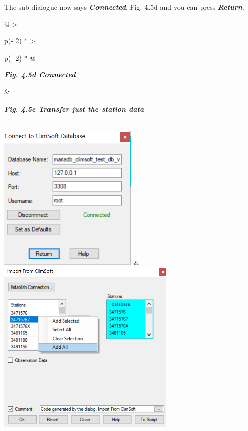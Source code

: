\documentclass[
  letterpaper,
  DIV=11,
  numbers=noendperiod]{scrreprt}
\begin{document}
The sub-dialogue now says \textbf{\emph{Connected}}, Fig. 4.5d and you
can press \textbf{\emph{Return}}.

\begin{longtable}[]{@{}
  >{\raggedright\arraybackslash}p{(\columnwidth - 2\tabcolsep) * }
  >{\raggedright\arraybackslash}p{(\columnwidth - 2\tabcolsep) * }@{}}
\toprule\noalign{}
\begin{minipage}[b]{\linewidth}\raggedright
\textbf{\emph{Fig. 4.5d Connected}}
\end{minipage} & \begin{minipage}[b]{\linewidth}\raggedright
\textbf{\emph{Fig. 4.5e Transfer just the station data}}
\end{minipage} \\
\midrule\noalign{}
\endhead
\bottomrule\noalign{}
\endlastfoot
\includegraphics[width=2.62513in,height=2.76403in]{figures/Fig4.5d.png}
&
\includegraphics[width=3.3454in,height=3.29135in]{figures/Fig4.5e.png} \\
\end{longtable}
\end{document}
